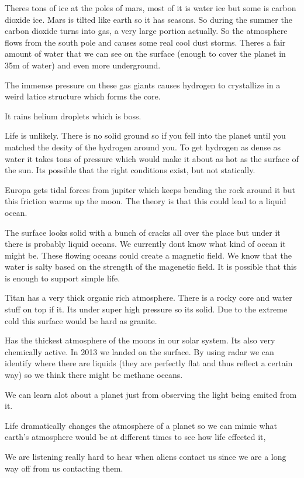 \documentclass{article}
\begin{document}

Theres tons of ice at the poles of mars, most of it is water ice but some is carbon dioxide ice. Mars is tilted like earth so it has seasons. So during the summer the carbon dioxide turns into gas, a very large portion actually. So the atmosphere flows from the south pole and causes some real cool dust storms. Theres a fair amount of water that we can see on the surface (enough to cover the planet in 35m of water) and even more underground.


The immense pressure on these gas giants causes hydrogen to crystallize in a weird latice structure which forms the core.


It rains helium droplets which is boss.


Life is unlikely. There is no solid ground so if you fell into the planet until you matched the desity of the hydrogen around you. To get hydrogen as dense as water it takes tons of pressure which would make it about as hot as the surface of the sun. Its possible that the right conditions exist, but not statically.


Europa gets tidal forces from jupiter which keeps bending the rock around it but this friction warms up the moon. The theory is that this could lead to a liquid ocean.


The surface looks solid with a bunch of cracks all over the place but under it there is probably liquid oceans. We currently dont know what kind of ocean it might be. These flowing oceans could create a magnetic field. We know that the water is salty based on the strength of the magenetic field. It is possible that this is enough to support simple life.


Titan has a very thick organic rich atmosphere. There is a rocky core and water stuff on top if it. Its under super high pressure so its solid. Due to the extreme cold this surface would be hard as granite.


Has the thickest atmosphere of the moons in our solar system. Its also very chemically active. In 2013 we landed on the surface. By using radar we can identify where there are liquids (they are perfectly flat and thus reflect a certain way) so we think there might be methane oceans.


We can learn alot about a planet just from observing the light being emited from it.


Life dramatically changes the atmosphere of a planet so we can mimic what earth's atmosphere would be at different times to see how life effected it,




We are listening really hard to hear when aliens contact us since we are a long way off from us contacting them.


\end{document}
